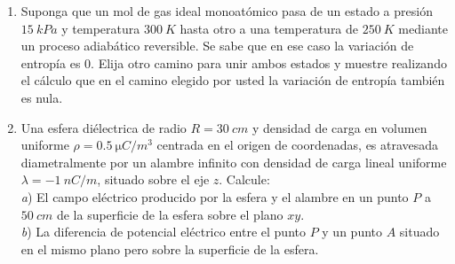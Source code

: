 \documentclass[a4paper,11pt,dvipsnames, twocolumn]{article}
\def\cosa{-0.69466}
\def\sina{-0.71934}
\begin{document}
\begin{enumerate}[wide, labelwidth=2pt, labelindent=0pt]
\item Suponga que un mol de gas ideal monoatómico pasa de un estado a presión $\SI{15}{kPa}$ y temperatura $\SI{300}{K}$ hasta otro a una temperatura de $\SI{250}{K}$ mediante un proceso adiabático reversible. Se sabe que en ese caso la variación de entropía es $0$. Elija otro camino para unir ambos estados y muestre realizando el cálculo que en el camino elegido por usted la variación de entropía también es nula.


\item Una esfera diélectrica de radio $R = \SI{30}{cm}$ y densidad de carga en volumen uniforme $\rho = \SI{0.5}{\micro C/m^3}$ centrada en el origen de coordenadas, es atravesada diametralmente por un alambre infinito con densidad de carga lineal uniforme $\lambda = \SI{-1}{nC/m}$, situado sobre el eje $z$. Calcule:\\
\textit{a}) El campo eléctrico producido por la esfera y el alambre en un punto $P$ a $\SI{50}{cm}$ de la superficie de la esfera sobre el plano $xy$.\\
\textit{b}) La diferencia de potencial eléctrico entre el punto $P$ y un punto $A$ situado en el mismo plano pero sobre la superficie de la esfera.

\begin{center}
\end{center}


\end{enumerate}
\end{document}

